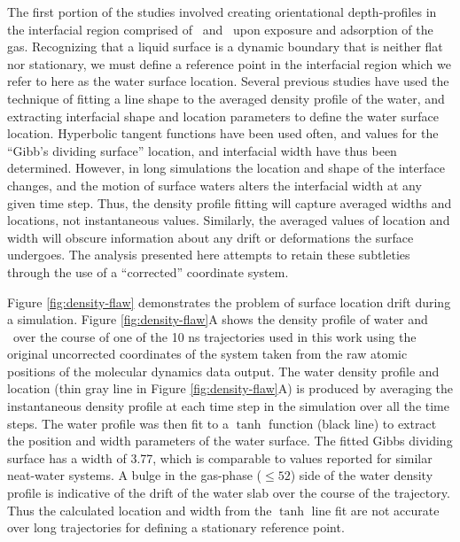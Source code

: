 \documentclass{article}
\begin{document}
	The first portion of the studies involved creating orientational depth-profiles in the interfacial region comprised of \suldiox~and \wat~upon exposure and adsorption of the gas. Recognizing that a liquid surface is a dynamic boundary that is neither flat nor stationary, we must define a reference point in the interfacial region which we refer to here as the water surface location. Several previous studies have used the technique of fitting a line shape to the averaged density profile of the water, and extracting interfacial shape and location parameters to define the water surface location.\cite{Shamay2010,Wick2006c,Chowdhary2006} Hyperbolic tangent functions have been used often, and values for the ``Gibb's dividing surface'' location, and interfacial width have thus been determined.\cite{Matsumoto1988} However, in long simulations the location and shape of the interface changes, and the motion of surface waters alters the interfacial width at any given time step. Thus, the density profile fitting will capture averaged widths and locations, not instantaneous values. Similarly, the averaged values of location and width will obscure information about any drift or deformations the surface undergoes. The analysis presented here attempts to retain these subtleties through the use of a ``corrected'' coordinate system.
	
Figure \ref{fig:density-flaw} demonstrates the problem of surface location drift during a simulation. Figure \ref{fig:density-flaw}A shows the density profile of water and \suldiox~over the course of one of the 10 ns trajectories used in this work using the original uncorrected coordinates of the system taken from the raw atomic positions of the molecular dynamics data output. The water density profile and location (thin gray line in Figure \ref{fig:density-flaw}A) is produced by averaging the instantaneous density profile at each time step in the simulation over all the time steps. The water profile was then fit to a $\tanh$ function (black line) to extract the position and width parameters of the water surface. The fitted Gibbs dividing surface has a width of 3.77\angs, which is comparable to values reported for similar neat-water systems.\cite{Dang1997,Hore2008} A bulge in the gas-phase ($\leq 52$\angs) side of the water density profile is indicative of the drift of the water slab over the course of the trajectory. Thus the calculated location and width from the $\tanh$ line fit are not accurate over long trajectories for defining a stationary reference point. 
\end{document}
